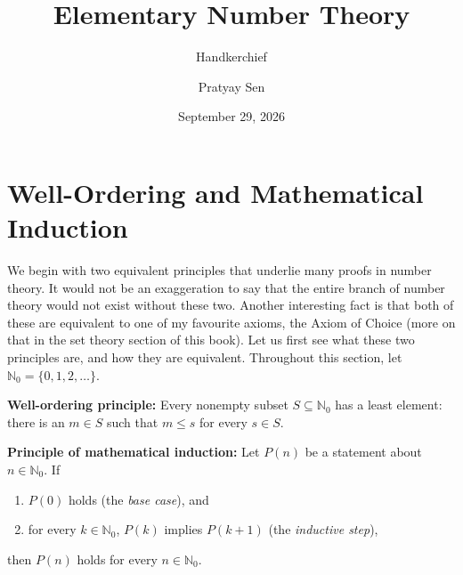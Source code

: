 \documentclass[a4paper,11pt,abstracton]{scrartcl}
\theoremstyle{dotlessP}
\theoremstyle{dotlessS}
\theoremstyle{remark}
\theoremstyle{definition}
\begin{document}

\title{Elementary Number Theory}
\subtitle{Handkerchief}
\author{Pratyay Sen}
\date{September 29, 2026}
\maketitle

\tableofcontents

\eject



\section{Well-Ordering and Mathematical Induction}

We begin with two equivalent principles that underlie many proofs in
number theory. It would not be an exaggeration to say that the entire branch of number theory would not exist without these two. Another interesting fact is that both of these are equivalent to one of my favourite axioms, the Axiom of Choice (more on that in the set theory section of this book). Let us first see what these two principles are, and how they are equivalent. Throughout this section, let
$\mathbb{N}_0=\{0,1,2,\ldots\}$.

\begin{definition_box}
\textbf{Well-ordering principle:}
Every nonempty subset $S\subseteq\mathbb{N}_0$ has a least element:
there is an $m\in S$ such that $m\leq s$ for every $s\in S$.
\end{definition_box}

\begin{definition_box}
\textbf{Principle of mathematical induction:}
Let $P(n)$ be a statement about $n\in\mathbb{N}_0$. If
\begin{enumerate}
    \item $P(0)$ holds (the \emph{base case}), and
    \item for every $k\in\mathbb{N}_0$, $P(k)$ implies $P(k+1)$
    (the \emph{inductive step}),
\end{enumerate}
then $P(n)$ holds for every $n\in\mathbb{N}_0$.
\end{definition_box}
\end{document}
